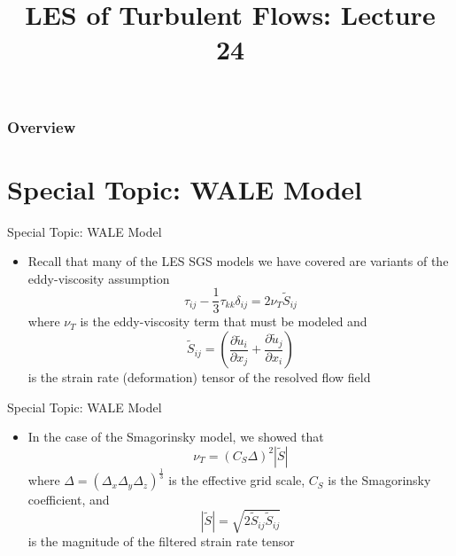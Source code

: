 
\title{LES of Turbulent Flows: Lecture 24}



\begin{frame} 
  \titlepage
\end{frame}


\begin{frame}
\frametitle{Overview}
\tableofcontents
\end{frame}

\section{Special Topic: WALE Model} %
\begin{frame}{Special Topic: WALE Model}
\begin{itemize}
	\item Recall that many of the LES SGS models we have covered are variants of the eddy-viscosity assumption
	$$\tau_{ij} - \frac{1}{3}\tau_{kk}\delta_{ij} = 2 \nu_T \widetilde{S}_{ij}$$
	where $\nu_T$ is the eddy-viscosity term that must be modeled and 
	$$\widetilde{S}_{ij} = \left(\frac{\partial \widetilde{u}_i}{\partial x_j} + \frac{\partial \widetilde{u}_j}{\partial x_i}\right)$$
	is the strain rate (deformation) tensor of the resolved flow field
\end{itemize}
\end{frame}
\begin{frame}{Special Topic: WALE Model}
\begin{itemize}
	\item In the case of the Smagorinsky model, we showed that
	$$\nu_T = (C_S \Delta)^2 | \widetilde{S}|$$
	where $\Delta = (\Delta_x \Delta_y \Delta_z)^{\frac{1}{3}}$ is the effective grid scale, $C_S$ is the Smagorinsky coefficient, and 
	$$|\widetilde{S}| = \sqrt{2\widetilde{S}_{ij}\widetilde{S}_{ij}}$$ is the magnitude of the filtered strain rate tensor
\end{itemize}
\end{frame}
